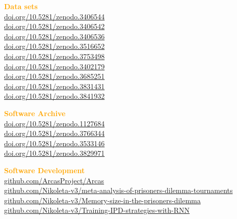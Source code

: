 \documentclass{beamer}
\begin{document}
\begin{frame}
    \begin{center}
        \small{\textbf{\textcolor{orange}{Data sets}}} \\
        \scriptsize{\url{doi.org/10.5281/zenodo.3406544}} \\
        \scriptsize{\url{doi.org/10.5281/zenodo.3406542}} \\
        \scriptsize{\url{doi.org/10.5281/zenodo.3406536}} \\
        \scriptsize{\url{doi.org/10.5281/zenodo.3516652}} \\
        \scriptsize{\url{doi.org/10.5281/zenodo.3753498}} \\
        \scriptsize{\url{doi.org/10.5281/zenodo.3402179}} \\
        \scriptsize{\url{doi.org/10.5281/zenodo.3685251}} \\
        \scriptsize{\url{doi.org/10.5281/zenodo.3831431}} \\
        \scriptsize{\url{doi.org/10.5281/zenodo.3841932}} \\
        \vspace{.3cm}

        \small{\textbf{\textcolor{orange}{Software Archive}}} \\
        \scriptsize{\url{doi.org/10.5281/zenodo.1127684}} \\
        \scriptsize{\url{doi.org/10.5281/zenodo.3766344}} \\
        \scriptsize{\url{doi.org/10.5281/zenodo.3533146}} \\
        \scriptsize{\url{doi.org/10.5281/zenodo.3829971}} \\
        \vspace{.3cm}

        \small{\textbf{\textcolor{orange}{Software Development}}} \\
        \scriptsize{\url{github.com/ArcasProject/Arcas}} \\
        \scriptsize{\url{github.com/Nikoleta-v3/meta-analysis-of-prisoners-dilemma-tournaments}} \\
        \scriptsize{\url{github.com/Nikoleta-v3/Memory-size-in-the-prisoners-dilemma}} \\
        \scriptsize{\url{github.com/Nikoleta-v3/Training-IPD-strategies-with-RNN}} \\
    \end{center}
\end{frame}
\end{document}
